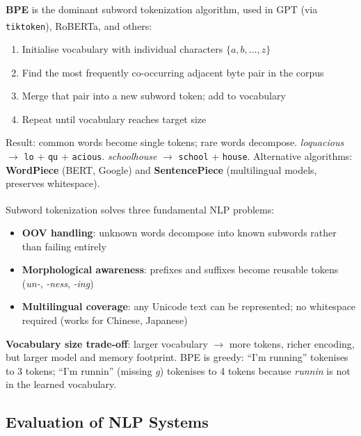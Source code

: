 \begin{tcbitemize}[ skin=sectionraster ]
    \tcbitem[title={Byte Pair Encoding (BPE)}, raster multicolumn=3]
    \textbf{BPE} is the dominant subword tokenization algorithm, used in GPT (via \texttt{tiktoken}), RoBERTa, and others\textsuperscript{\cite[][pp.~20--22]{farrisHowLargeLanguage2025}}:
    \begin{enumerate}
        \item Initialise vocabulary with individual characters $\{a, b, \ldots, z\}$
        \item Find the most frequently co-occurring adjacent byte pair in the corpus
        \item Merge that pair into a new subword token; add to vocabulary
        \item Repeat until vocabulary reaches target size
    \end{enumerate}
    Result: common words become single tokens; rare words decompose.
    \emph{loquacious} $\to$ \texttt{lo} + \texttt{qu} + \texttt{acious}.
    \emph{schoolhouse} $\to$ \texttt{school} + \texttt{house}.
    Alternative algorithms: \textbf{WordPiece} (BERT, Google) and \textbf{SentencePiece} (multilingual models, preserves whitespace).

    \tcbitem[title={Why Subword Tokenization Dominates}, raster multicolumn=3]
    Subword tokenization solves three fundamental NLP problems\textsuperscript{\cite[][pp.~15--16]{farrisHowLargeLanguage2025}}:
    \begin{itemize}
        \item \textbf{OOV handling}: unknown words decompose into known subwords rather than failing entirely
        \item \textbf{Morphological awareness}: prefixes and suffixes become reusable tokens (\emph{un-}, \emph{-ness}, \emph{-ing})
        \item \textbf{Multilingual coverage}: any Unicode text can be represented; no whitespace required (works for Chinese, Japanese)
    \end{itemize}
    \textbf{Vocabulary size trade-off}: larger vocabulary $\to$ more tokens, richer encoding, but larger model and memory footprint.
    BPE is greedy: ``I'm running'' tokenises to 3 tokens; ``I'm runnin'' (missing \emph{g}) tokenises to 4 tokens because \emph{runnin} is not in the learned vocabulary.
\end{tcbitemize}

\subsection{Evaluation of NLP Systems}

